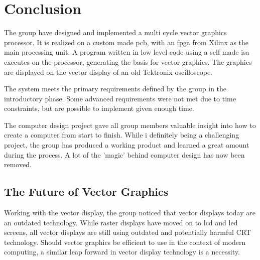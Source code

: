 \chapter{Conclusion}
The group have designed and implemented a multi cycle vector graphics processor.
It is realized on a custom made \gls{pcb}, with an \gls{fpga} from Xilinx as the main processing unit.
A program written in low level code using a self made \gls{isa} executes on the processor, generating the basis for vector graphics.
The graphics are displayed on the vector display of an old Tektronix oscilloscope.

The system meets the primary requirements defined by the group in the introductory phase. 
Some advanced requirements were not met due to time constraints, but are possible to implement given enough time. 

The computer design project gave all group members valuable insight into how to create a computer from start to finish.
While i definitely being a challenging project, the group has produced a working product and learned a great amount during the process.
A lot of the 'magic' behind computer design has now been removed.

\section{The Future of Vector Graphics}

Working with the vector display, the group noticed that vector displays today are an outdated technology. 
While raster displays have moved on to \gls{lcd} and \gls{led} screens, all vector displays are still using outdated and potentially harmful CRT technology.
Should vector graphics be efficient to use in the context of modern computing, a similar leap forward in vector display technology is a necessity.

